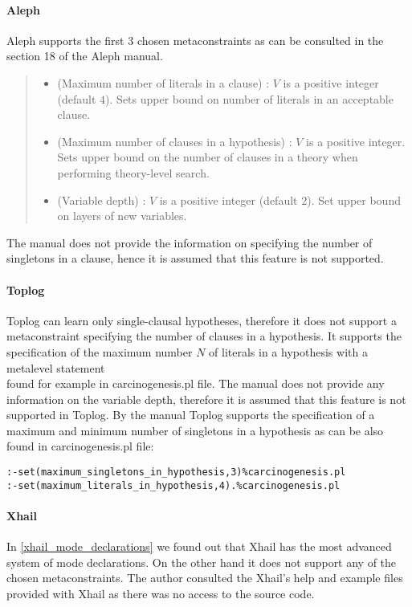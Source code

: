 \paragraph{Aleph}
Aleph supports the first 3 chosen metaconstraints as can be consulted in the section 18 of the Aleph manual\cite{aleph2007}.
\begin{quote}
\begin{itemize}
\item (Maximum number of literals in a clause) :
$V$ is a positive integer (default $4$). Sets upper bound on number of literals in an acceptable clause.
\item (Maximum number of clauses in a hypothesis) :
$V$ is a positive integer. Sets upper bound on the number of clauses in a theory  when performing theory-level search.
\item (Variable depth) : $V$ is a positive integer (default $2$). Set upper bound on layers of new variables.
\end{itemize}
\end{quote}

The manual does not provide the information on specifying the number of singletons in a clause, hence it is assumed that this feature is not supported.

\paragraph{Toplog}
Toplog can learn only single-clausal hypotheses\cite{muggleton2012mc}, therefore it does not support a metaconstraint specifying the number of clauses in a hypothesis. It supports the specification of the maximum number $N$ of literals in a hypothesis with a metalevel statement\\
 found for example in carcinogenesis.pl file\cite{santos2008toplogWebsite}. The manual does not provide any information on the variable depth, therefore it is assumed that this feature is not supported in Toplog.
By the manual Toplog supports the specification of a maximum and minimum number of singletons in a hypothesis as can be also found in carcinogenesis.pl file:
\begin{lstlisting}
:-set(maximum_singletons_in_hypothesis,3)%carcinogenesis.pl
:-set(maximum_literals_in_hypothesis,4).%carcinogenesis.pl
\end{lstlisting}

\paragraph{Xhail}
In \ref{xhail_mode_declarations} we found out that Xhail has the most advanced system of mode declarations. On the other hand it does not support any of the chosen metaconstraints\cite{ray2007xhail}. The author consulted the Xhail's help and example files provided with Xhail as there was no access to the source code.


